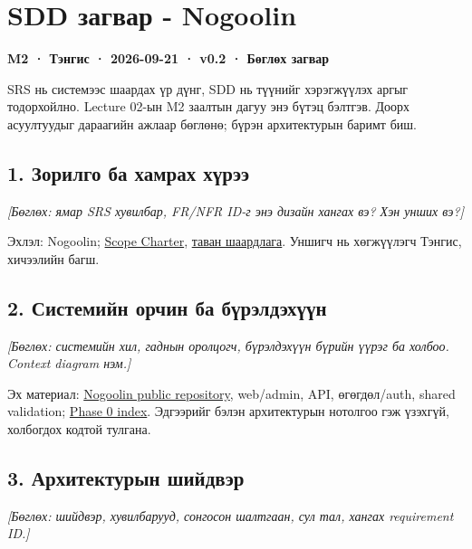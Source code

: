 \section{SDD загвар -
Nogoolin}\label{doc6-sdd-ux437ux430ux433ux432ux430ux440---nogoolin}

\textbf{M2 · Тэнгис · 2026-09-21 · v0.2 · Бөглөх загвар}

SRS нь системээс шаардах үр дүнг, SDD нь түүнийг хэрэгжүүлэх аргыг
тодорхойлно. Lecture 02-ын M2 заалтын дагуу энэ бүтэц бэлтгэв. Доорх
асуултуудыг дараагийн ажлаар бөглөнө; бүрэн архитектурын баримт биш.

\subsection{1. Зорилго ба хамрах
хүрээ}\label{doc6-ux437ux43eux440ux438ux43bux433ux43e-ux431ux430-ux445ux430ux43cux440ux430ux445-ux445ux4afux440ux44dux44d}

\emph{{[}Бөглөх: ямар SRS хувилбар, FR/NFR ID-г энэ дизайн хангах вэ?
Хэн унших вэ?{]}}

Эхлэл: Nogoolin; \href{../../requirements/scope-charter.md}{Scope
Charter}, \href{../../requirements/requirements.md}{таван шаардлага}.
Уншигч нь хөгжүүлэгч Тэнгис, хичээлийн багш.

\subsection{2. Системийн орчин ба
бүрэлдэхүүн}\label{doc6-ux441ux438ux441ux442ux435ux43cux438ux439ux43d-ux43eux440ux447ux438ux43d-ux431ux430-ux431ux4afux440ux44dux43bux434ux44dux445ux4afux4afux43d}

\emph{{[}Бөглөх: системийн хил, гаднын оролцогч, бүрэлдэхүүн бүрийн
үүрэг ба холбоо. Context diagram нэм.{]}}

Эх материал: \href{https://github.com/Tengis01/Nogoolin}{Nogoolin public
repository}, web/admin, API, өгөгдөл/auth, shared validation;
\href{../../phase-0/README.md}{Phase 0 index}. Эдгээрийг бэлэн
архитектурын нотолгоо гэж үзэхгүй, холбогдох кодтой тулгана.

\subsection{3. Архитектурын
шийдвэр}\label{doc6-ux430ux440ux445ux438ux442ux435ux43aux442ux443ux440ux44bux43d-ux448ux438ux439ux434ux432ux44dux440}

\emph{{[}Бөглөх: шийдвэр, хувилбарууд, сонгосон шалтгаан, сул тал,
хангах requirement ID.{]}}

